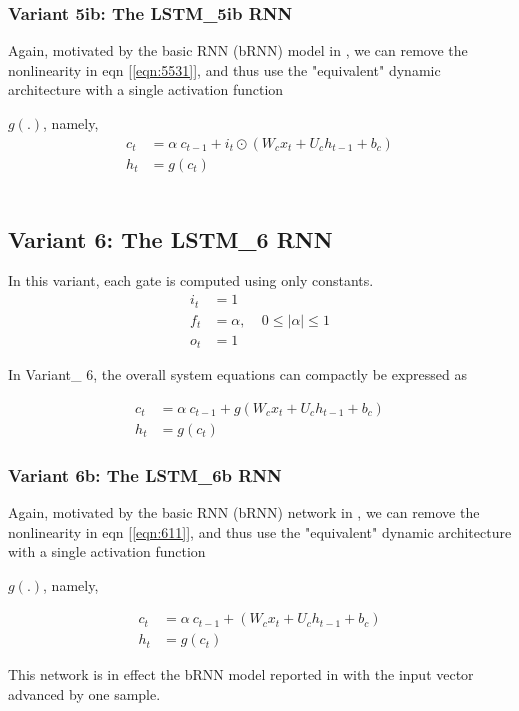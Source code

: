 \documentclass{article}
\begin{document}
{\subsubsection{Variant 5ib: The LSTM\_5ib RNN}
Again, motivated by the basic RNN (bRNN) model in \cite {salem2016basic}, we can remove the nonlinearity in eqn [\ref{eqn:5531}], and thus use the "equivalent" dynamic architecture with a single activation function {$g(.)$, namely,
\begin{align}
	\label{eqn:531}	c_t &=  \alpha ~ c_{t-1} + i_t \odot (W_c x_t + U_c h_{t-1} + b_c)\\
	\label{eqn:541}	h_t &=  g(c_t)
\end{align}
\\

\subsection{Variant 6: The LSTM\_6 RNN}
In this variant, each gate is computed using only constants.
\begin{align}
	i_t &= 1 \\
	f_t &= \alpha , ~~~~~  0 \leq |\alpha| \leq  1 \\
	o_t &= 1
\end{align}

In {Variant\_ 6}, the overall system equations can compactly be expressed as

\begin{align}
	\label{eqn:611}   c_t &= \alpha ~ c_{t-1} + g(W_c x_t + U_c h_{t-1} + b_c) \\
	\label{eqn:612}	 h_t &=  g(c_t)
\end{align}

\subsubsection{Variant 6b: The LSTM\_6b RNN}
Again, motivated by the basic RNN (bRNN) network in \cite {salem2016basic}, we can remove the nonlinearity in eqn [\ref{eqn:611}], and thus use the "equivalent" dynamic architecture with a single activation function {$g(.)$, namely,

\begin{align}
	\label{eqn:611}   c_t &= \alpha ~ c_{t-1} + (W_c x_t + U_c h_{t-1} + b_c) \\
	\label{eqn:612}	 h_t &=  g(c_t)
\end{align}

This network is in effect the bRNN model reported in \cite {salem2016basic} with the input vector advanced by one sample.
\\
\\

}}}
\end{document}

